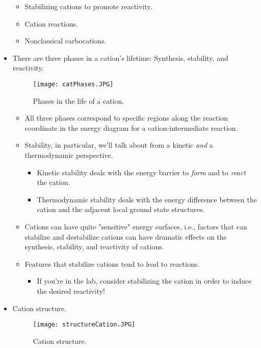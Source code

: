 \documentclass[../notes.tex]{subfiles}
\begin{document}
\begin{itemize}
\begin{itemize}
        \item Stabilizing cations to promote reactivity.
        \item Cation reactions.
        \item Nonclassical carbocations.
    \end{itemize}
    \item There are three phases in a cation's lifetime: Synthesis, stability, and reactivity.
    \begin{figure}[H]
        \centering
        \texttt{[image: catPhases.JPG]}
        \caption{Phases in the life of a cation.}
        \label{fig:catPhases}
    \end{figure}
    \begin{itemize}
        \item All three phases correspond to specific regions along the reaction coordinate in the energy diagram for a cation-intermediate reaction.
        \item Stability, in particular, we'll talk about from a kinetic \emph{and} a thermodynamic perspective.
        \begin{itemize}
            \item Kinetic stability deals with the energy barrier to \emph{form} and to \emph{react} the cation.
            \item Thermodynamic stability deals with the energy difference between the cation and the adjacent local ground state structures.
        \end{itemize}
        \item Cations can have quite "sensitive" energy surfaces, i.e., factors that can stabilize and destabilize cations can have dramatic effects on the synthesis, stability, and reactivity of cations.
        \item Features that stabilize cations tend to lead to reactions.
        \begin{itemize}
            \item If you're in the lab, consider stabilizing the cation in order to induce the desired reactivity!
        \end{itemize}
    \end{itemize}
    \item Cation structure.
    \begin{figure}[h!]
        \centering
        \texttt{[image: structureCation.JPG]}
        \caption{Cation structure.}
        \label{fig:structureCation}
    \end{figure}

\end{itemize}
\end{document}
